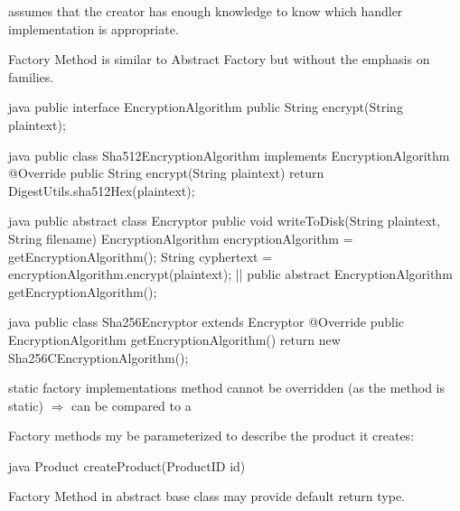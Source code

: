 \begin{notebox}\nospacing
  assumes that the  creator has enough knowledge to know
  which handler implementation is appropriate.
\end{notebox}
\begin{notebox}\nospacing
  Factory Method is similar to Abstract Factory but without the emphasis on families.
\end{notebox}
\begin{codeboxNl}{java}
public interface EncryptionAlgorithm {
  public String encrypt(String plaintext);
}
\end{codeboxNl}
\begin{codeboxNl}{java}
public class Sha512EncryptionAlgorithm implements EncryptionAlgorithm {
  @Override
  public String encrypt(String plaintext) {
      return DigestUtils.sha512Hex(plaintext);
  }
}
\end{codeboxNl}
\begin{codeboxNl}{java}
 public abstract class Encryptor {
  public void writeToDisk(String plaintext, String filename) {
      EncryptionAlgorithm encryptionAlgorithm = getEncryptionAlgorithm();
      String cyphertext = encryptionAlgorithm.encrypt(plaintext);
      |\optldots|
  }
  public abstract EncryptionAlgorithm getEncryptionAlgorithm();
} 
\end{codeboxNl}
\begin{codeboxNl}[ConcreteCreator]{java}
  public class Sha256Encryptor extends Encryptor {
    @Override
    public EncryptionAlgorithm getEncryptionAlgorithm() {
        return new Sha256CEncryptionAlgorithm();
    }
}
\end{codeboxNl}
\begin{sectionbox}\nospacing
  \begin{itemizenosep}
      \item static factory implementations method cannot be overridden (as the
    method is static) $\Rightarrow$ can be compared to a  \item Factory methods my be parameterized to describe the product it
    creates:
    \begin{mintlinebox}{java}
      Product createProduct(ProductID id)
    \end{mintlinebox}
    \item Factory Method in abstract base class may provide default return type.
  \end{itemizenosep}
\end{sectionbox}
